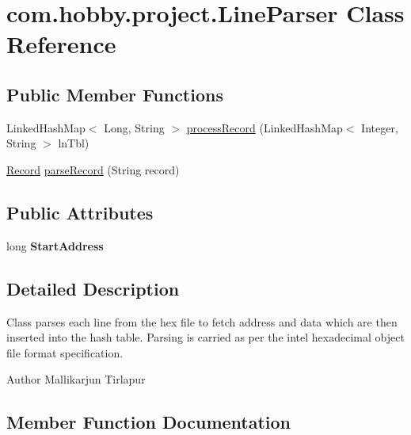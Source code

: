 \hypertarget{classcom_1_1hobby_1_1project_1_1_line_parser}{}\section{com.\+hobby.\+project.\+Line\+Parser Class Reference}
\label{classcom_1_1hobby_1_1project_1_1_line_parser}
\subsection*{Public Member Functions}
\begin{DoxyCompactItemize}
\item 
Linked\+Hash\+Map$<$ Long, String $>$ \hyperlink{classcom_1_1hobby_1_1project_1_1_line_parser_a6772015da2caff24e4d3c94589b1a5ff}{process\+Record} (Linked\+Hash\+Map$<$ Integer, String $>$ ln\+Tbl)
\item 
\hyperlink{classcom_1_1hobby_1_1project_1_1_record}{Record} \hyperlink{classcom_1_1hobby_1_1project_1_1_line_parser_aefe344a1777568d60dd3dc90bb5c02d2}{parse\+Record} (String record)
\end{DoxyCompactItemize}
\subsection*{Public Attributes}
\begin{DoxyCompactItemize}
\item 
\mbox{\label{classcom_1_1hobby_1_1project_1_1_line_parser_a8082146904ae10b2d6c6abba5a351633}} 
long {\bfseries Start\+Address}
\end{DoxyCompactItemize}


\subsection{Detailed Description}
Class parses each line from the hex file to fetch address and data which are then inserted into the hash table. Parsing is carried as per the intel hexadecimal object file format specification.

\begin{DoxyAuthor}{Author}
Mallikarjun Tirlapur 
\end{DoxyAuthor}


\subsection{Member Function Documentation}
\mbox{\label{classcom_1_1hobby_1_1project_1_1_line_parser_aefe344a1777568d60dd3dc90bb5c02d2}} 
